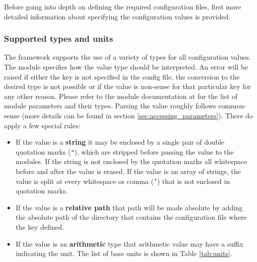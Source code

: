 Before going into depth on defining the required configuration files, first more detailed information about specifying the configuration values is provided.

\subsubsection{Supported types and units}
\label{sec:config_values}
The \apsq framework supports the use of a variety of types for all configuration values. The module specifies how the value type should be interpreted. An error will be raised if either the key is not specified in the config file, the conversion to the desired type is not possible or if the value is non-sense for that particular key for any other reason. Please refer to the module documentation at \needref for the list of module parameters and their types. Parsing the value roughly follows common-sense (more details can be found in section \ref{sec:accessing_parameters}). There do apply a few special rules:
\begin{itemize}
\item If the value is a \textbf{string} it may be enclosed by a single pair of double quotation marks (\texttt{"}), which are stripped before passing the value to the modules. If the string is not enclosed by the quotation marks all whitespace before and after the value is erased. If the value is an array of strings, the value is split at every whitespace or comma (\texttt{'}) that is not enclosed in quotation marks.
\item If the value is a \textbf{relative path} that path will be made absolute by adding the absolute path of the directory that contains the configuration file where the key defined.
\item If the value is an \textbf{arithmetic} type that arithmetic value may have a suffix indicating the unit. The list of base units is shown in Table \ref{tab:units}. 
\end{itemize}

